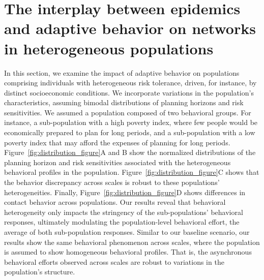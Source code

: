 \documentclass[9pt,twocolumn,twoside]{pnas-new}
\begin{document}
\section*{The interplay between epidemics and adaptive behavior on networks in heterogeneous populations} 
%
In this section, we examine the impact of adaptive behavior on populations comprising individuals with heterogeneous risk tolerance, driven, for instance, by distinct socioeconomic conditions.
%
%
We incorporate variations in the population's characteristics, assuming bimodal distributions of planning horizons and risk sensitivities.
%
We assumed a population composed of two behavioral groups. For instance, a sub-population with a high poverty index, where few people would be economically prepared to plan for long periods, and a sub-population with a low poverty index that may afford the expenses of planning for long periods.
%
Figure~\ref{fig:distribution_figure}A and B show the normalized distributions of the planning horizon and risk sensitivities associated with the heterogeneous behavioral profiles in the population.
Figure~\ref{fig:distribution_figure}C shows that the behavior discrepancy across scales is robust to these populations' heterogeneities. 
Finally, Figure~\ref{fig:distribution_figure}D shows differences in contact behavior across populations. Our results reveal that behavioral heterogeneity only impacts the stringency of the sub-populations' behavioral responses, ultimately modulating the population-level behavioral effort, the average of both sub-population responses.
Similar to our baseline scenario, our results show the same behavioral phenomenon across scales, where the population is assumed to show homogeneous behavioral profiles.
That is, the asynchronous behavioral efforts observed across scales are robust to variations in the population's structure.
\end{document}
